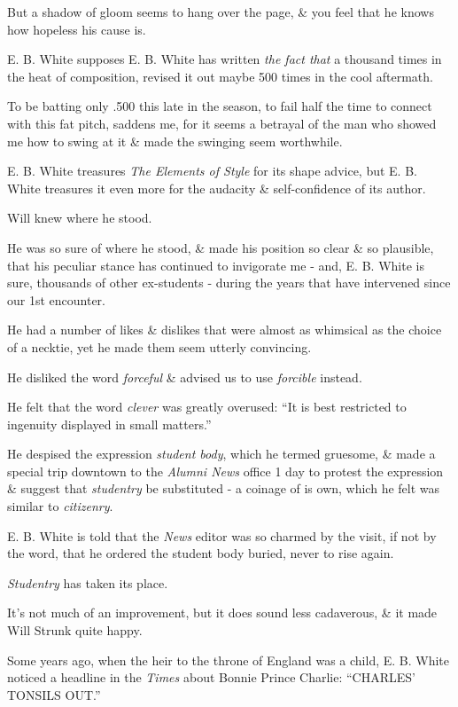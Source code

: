 \documentclass{article}
\begin{document}
But a shadow of gloom seems to hang over the page, \& you feel that he knows how hopeless his cause is.

E. B. White supposes E. B. White has written {\it the fact that} a thousand times in the heat of composition, revised it out maybe 500 times in the cool aftermath.

To be batting only .500 this late in the season, to fail half the time to connect with this fat pitch, saddens me, for it seems a betrayal of the man who showed me how to swing at it \& made the swinging seem worthwhile.

%
E. B. White treasures {\it The Elements of Style} for its shape advice, but E. B. White treasures it even more for the audacity \& self-confidence of its author.

Will knew where he stood.

He was so sure of where he stood, \& made his position so clear \& so plausible, that his peculiar stance has continued to invigorate me - and, E. B. White is sure, thousands of other ex-students - during the years that have intervened since our 1st encounter.

He had a number of likes \& dislikes that were almost as whimsical as the choice of a necktie, yet he made them seem utterly convincing.

He disliked the word {\it forceful} \& advised us to use {\it forcible} instead.

He felt that the word {\it clever} was greatly overused: ``It is best restricted to ingenuity displayed in small matters.''

He despised the expression {\it student body}, which he termed gruesome, \& made a special trip downtown to the {\it Alumni News} office 1 day to protest the expression \& suggest that {\it studentry} be substituted - a coinage of is own, which he felt was similar to {\it citizenry}.

E. B. White is told that the {\it News} editor was so charmed by the visit, if not by the word, that he ordered the student body buried, never to rise again.

{\it Studentry} has taken its place.

It's not much of an improvement, but it does sound less cadaverous, \& it made Will Strunk quite happy.

%
Some years ago, when the heir to the throne of England was a child, E. B. White noticed a headline in the {\it Times} about Bonnie Prince Charlie: ``CHARLES' TONSILS OUT.''
\end{document}
